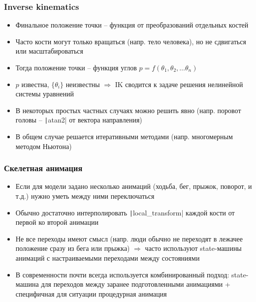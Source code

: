 \documentclass[10pt]{beamer}
\begin{document}
\begin{frame}[fragile]
\frametitle{Inverse kinematics}
\begin{itemize}
\item Финальное положение точки -- функция от преобразований отдельных костей
\pause
\item Часто кости могут только вращаться (напр. тело человека), но не сдвигаться или масштабироваться
\pause
\item Тогда положение точки -- функция углов \begin{math}p = f(\theta_1, \theta_2, \dots \theta_n)\end{math}
\pause
\item \begin{math}p\end{math} известна, \begin{math}\{\theta_i\}\end{math} неизвестны \begin{math}\Longrightarrow\end{math} IK сводится к задаче решения нелинейной системы уравнений
\pause
\item В некоторых простых частных случаях можно решить явно (напр. поровот головы -- \texttt|atan2| от вектора направления)
\pause
\item В общем случае решается итеративными методами (напр. многомерным методом Ньютона)
\end{itemize}
\end{frame}

\begin{frame}[fragile]
\frametitle{Скелетная анимация}
\begin{itemize}
\item Если для модели задано несколько анимаций (ходьба, бег, прыжок, поворот, и т.д.) нужно уметь между ними переключаться
\pause
\item Обычно достаточно интерполировать \texttt|local_transform| каждой кости от первой ко второй анимации
\pause
\item Не все переходы имеют смысл (напр. люди обычно не переходят в лежачее положение сразу из бега или прыжка) \begin{math}\Longrightarrow\end{math} часто используют state-машины анимаций с настраиваемыми переходами между состояниями
\pause
\item В современности почти всегда используется комбинированный подход: state-машина для переходов между заранее подготовленными анимациями + специфичная для ситуации процедурная анимация
\end{itemize}
\end{frame}
\end{document}
